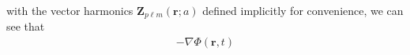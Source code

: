 \documentclass{article}
\begin{document}
with the vector harmonics $\mathbf{Z}_{p\ell m}(\mathbf{r};a)$ defined implicitly for convenience, we can see that
\begin{equation}
\begin{split}
-\nabla\Phi(\mathbf{r},t) 

\end{split}
\end{equation}
\end{document}
